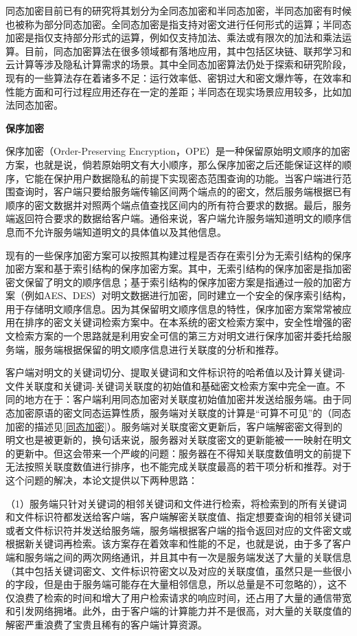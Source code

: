 \documentclass[promaster]{thesis-uestc}
\begin{document}
同态加密目前已有的研究将其划分为全同态加密和半同态加密，半同态加密有时候也被称为部分同态加密。全同态加密是指支持对密文进行任何形式的运算；半同态加密是指仅支持部分形式的运算，例如仅支持加法、乘法或有限次的加法和乘法运算。目前，同态加密算法在很多领域都有落地应用，其中包括区块链、联邦学习和云计算等涉及隐私计算需求的场景。其中全同态加密算法仍处于探索和研究阶段，现有的一些算法存在着诸多不足：运行效率低、密钥过大和密文爆炸等，在效率和性能方面和可行过程应用还存在一定的差距；半同态在现实场景应用较多，比如加法同态加密。


\textbf{保序加密}\label{保序加密}

保序加密（Order-Preserving Encryption，OPE）是一种保留原始明文顺序的加密方案，也就是说，倘若原始明文有大小顺序，那么保序加密之后还能保证这样的顺序，它能在保护用户数据隐私的前提下实现密态范围查询的功能。当客户端进行范围查询时，客户端只要给服务端传输区间两个端点的的密文，然后服务端根据已有顺序的密文数据并对照两个端点值查找区间内的所有符合要求的数据。最后，服务端返回符合要求的数据给客户端。通俗来说，客户端允许服务端知道明文的顺序信息而不允许服务端知道明文的具体值以及其他信息。

现有的一些保序加密方案可以按照其构建过程是否存在索引分为无索引结构的保序加密方案和基于索引结构的保序加密方案。其中，无索引结构的保序加密是指加密密文保留了明文的顺序信息；基于索引结构的保序加密方案是指通过一般的加密方案（例如AES、DES）对明文数据进行加密，同时建立一个安全的保序索引结构，用于存储明文顺序信息。因为其保留明文顺序信息的特性，保序加密方案常常被应用在排序的密文关键词检索方案中。在本系统的密文检索方案中，安全性增强的密文检索方案的一个思路就是利用安全可信的第三方对明文进行保序加密并委托给服务端，服务端根据保留的明文顺序信息进行关联度的分析和推荐。

客户端对明文的关键词切分、提取关键词和文件标识符的哈希值以及计算关键词-文件关联度和关键词-关键词关联度的初始值和基础密文检索方案中完全一直。不同的地方在于：客户端利用同态加密对关联度初始值加密并发送给服务端。由于同态加密原语的密文同态运算性质，服务端对关联度的计算是“可算不可见”的（同态加密的描述见\ref{同态加密}）。服务端对关联度密文更新后，客户端解密密文得到的明文也是被更新的，换句话来说，服务器对关联度密文的更新能被一一映射在明文的更新中。但这会带来一个严峻的问题：服务器在不得知关联度数值明文的前提下无法按照关联度数值进行排序，也不能完成关联度最高的若干项分析和推荐。对于这个问题的解决，本论文提供以下两种思路：

（1）服务端只针对关键词的相邻关键词和文件进行检索，将检索到的所有关键词和文件标识符都发送给客户端，客户端解密关联度值、指定想要查询的相邻关键词或者文件标识符并发送给服务端，服务端根据客户端的指令返回对应的文件密文或根据新关键词再检索。该方案存在着效率和性能的不足，也就是说，由于多了客户端和服务端之间的两次网络通讯，并且其中有一次是服务端发送了大量的关联信息（其中包括关键词密文、文件标识符密文以及对应的关联度值，虽然只是一些很小的字段，但是由于服务端可能存在大量相邻信息，所以总量是不可忽略的），这不仅浪费了检索的时间和增大了用户检索请求的响应时间，还占用了大量的通信带宽和引发网络拥堵。此外，由于客户端的计算能力并不是很高，对大量的关联度值的解密严重浪费了宝贵且稀有的客户端计算资源。
\end{document}
